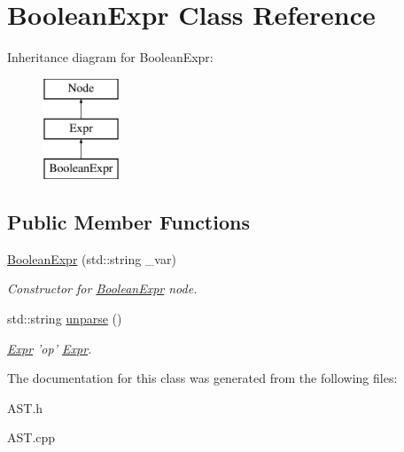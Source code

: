 \hypertarget{classBooleanExpr}{\section{Boolean\-Expr Class Reference}
\label{classBooleanExpr}
}
Inheritance diagram for Boolean\-Expr\-:\begin{figure}[H]
\begin{center}
\leavevmode
\includegraphics[height=3.000000cm]{classBooleanExpr}
\end{center}
\end{figure}
\subsection*{Public Member Functions}
\begin{DoxyCompactItemize}
\item 
\hypertarget{classBooleanExpr_a3bf7eb8048426d84900fd2047d4d5983}{\hyperlink{classBooleanExpr_a3bf7eb8048426d84900fd2047d4d5983}{Boolean\-Expr} (std\-::string \-\_\-var)}\label{classBooleanExpr_a3bf7eb8048426d84900fd2047d4d5983}

\begin{DoxyCompactList}\small\item\em Constructor for \hyperlink{classBooleanExpr}{Boolean\-Expr} node. \end{DoxyCompactList}\item 
\hypertarget{classBooleanExpr_a605d334f7d8b38d95dfd936b9fe72ca0}{std\-::string \hyperlink{classBooleanExpr_a605d334f7d8b38d95dfd936b9fe72ca0}{unparse} ()}\label{classBooleanExpr_a605d334f7d8b38d95dfd936b9fe72ca0}

\begin{DoxyCompactList}\small\item\em \hyperlink{classExpr}{Expr} 'op' \hyperlink{classExpr}{Expr}. \end{DoxyCompactList}\end{DoxyCompactItemize}


The documentation for this class was generated from the following files\-:\begin{DoxyCompactItemize}
\item 
A\-S\-T.\-h\item 
A\-S\-T.\-cpp\end{DoxyCompactItemize}
